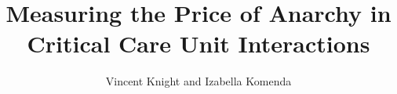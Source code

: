 \documentclass{beamer}
\title{Measuring the Price of Anarchy in Critical Care Unit Interactions}
\author{Vincent Knight and Izabella Komenda}
\begin{document}
\frame{\maketitle}
\end{document}
